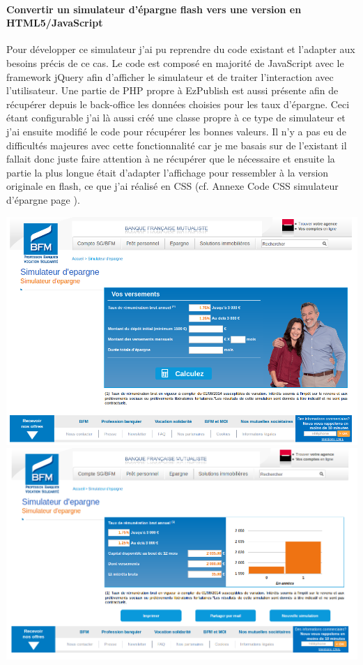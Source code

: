 \documentclass[a4paper,11pt,twoside]{report}
\begin{document}
      \paragraph*{Convertir un simulateur d'épargne flash vers une version en HTML5/JavaScript}
      Pour développer ce simulateur j'ai pu reprendre du code existant et l'adapter aux besoins précis de ce cas. Le code est composé en majorité de JavaScript avec le framework jQuery afin d'afficher le simulateur et de traiter l'interaction avec l'utilisateur. Une partie de PHP propre à EzPublish est aussi présente afin de récupérer depuis le back-office les données choisies pour les taux d'épargne. Ceci étant configurable j'ai là aussi créé une classe propre à ce type de simulateur et j'ai ensuite modifié le code pour récupérer les bonnes valeurs. Il n'y a pas eu de difficultés majeures avec cette fonctionnalité car je me basais sur de l'existant il fallait donc juste faire attention à ne récupérer que le nécessaire et ensuite la partie la plus longue était d'adapter l'affichage pour ressembler à la version originale en flash, ce que j'ai réalisé en CSS (cf. Annexe Code CSS simulateur d'épargne page \pageref{code_CSS_simulateur_d_epargne}).
      \begin{center}
	\includegraphics[width=\textwidth]{images/simu_epargne1.png} 
	\includegraphics[width=\textwidth]{images/simu_epargne2.png} 
	\label{epargne_simulator}
      \end{center}
\end{document}
